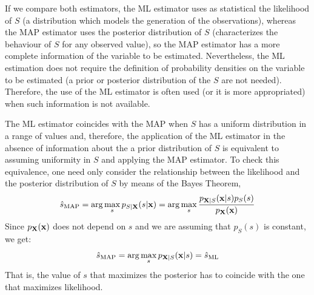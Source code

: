 If we compare both estimators, the ML estimator uses as statistical the likelihood of $S$ (a distribution which models the generation of the observations), whereas the MAP estimator uses the posterior distribution of $S$ (characterizes the behaviour of $S$ for any observed value), so the MAP estimator has a more complete information of the variable to be estimated. Nevertheless, the ML estimation does not require the definition of probability densities on the variable to be estimated (a prior or posterior distribution of the $S$ are not needed). Therefore, the use of the ML estimator is often used (or it is more appropriated) when such information is not available.

The ML estimator coincides with the MAP when $S$ has a uniform distribution in a range of values and, therefore, the application of the ML estimator in the absence of information about the a prior distribution of $S$ is equivalent to assuming uniformity in $S$ and applying the MAP estimator. To check this equivalence, one need only consider the relationship between the likelihood and the posterior distribution of $S$ by means of the Bayes Theorem,
$$ \hat s_{\text{MAP}} = \arg\max_{s} p_{{S|\bf X}}(s|{\bf x}) =  \arg\max_{s} \frac{p_{{\bf X}|S}({\bf x}|s) p_S(s)} {p_{\bf X}({\bf x})} $$
Since $p_{\bf X}({\bf x})$ does not depend {on $s$} and we are assuming that $p_S(s)$ is constant, we get:
$$ \hat s_{\text{MAP}} = \arg\max_{s} p_{{\bf X}|S}({\bf x}|s) = \hat s_{\text{ML}}$$
That is, the value of $s$ that maximizes the posterior has to coincide with the one that maximizes likelihood.



